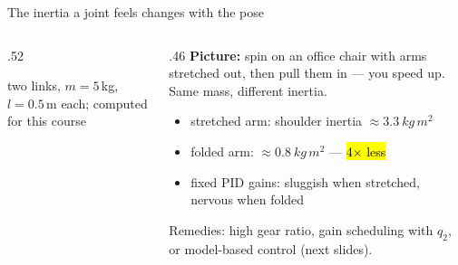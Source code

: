 \documentclass[aspectratio=169,10pt]{beamer}
\begin{document}
\begin{frame}{The inertia a joint feels changes with the pose}
\begin{columns}[T]
\begin{column}{.52\textwidth}
\centering
{}

{\scriptsize two links, $m=5$\,kg, $l=0.5$\,m each; computed for this course}
\end{column}
\begin{column}{.46\textwidth}
\small
\textbf{Picture:} spin on an office chair with arms stretched out, then pull them in --- you speed up. Same mass, different inertia.
\begin{itemize}\setlength\itemsep{.4mm}
\item stretched arm: shoulder inertia $\approx\SI{3.3}{kg\,m^2}$
\item folded arm: $\approx\SI{0.8}{kg\,m^2}$ --- \hl{4$\times$ less}
\item fixed PID gains: sluggish when stretched, nervous when folded
\end{itemize}
\begin{notebox}
\small Remedies: high gear ratio, gain scheduling with $q_2$, or model-based control (next slides).
\end{notebox}
\end{column}
\end{columns}
\end{frame}
\end{document}
